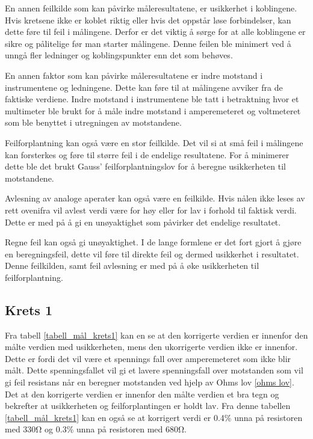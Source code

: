 \documentclass[twocolumn, a4paper, 11pt]{article} %
\begin{document}
En annen feilkilde som kan påvirke måleresultatene, er usikkerhet i koblingene. Hvis kretsene ikke er koblet riktig eller hvis det oppstår løse forbindelser, kan dette føre til feil i målingene. Derfor er det viktig å sørge for at alle koblingene er sikre og pålitelige før man starter målingene. Denne feilen ble minimert ved å unngå fler ledninger og koblingspunkter enn det som behøves.

En annen faktor som kan påvirke måleresultatene er indre motstand i instrumentene og ledningene. Dette kan føre til at målingene avviker fra de faktiske verdiene. Indre motstand i instrumentene ble tatt i betraktning hvor et multimeter ble brukt for å måle indre motstand i amperemeteret og voltmeteret som ble benyttet i utregningen av motstandene. 

Feilforplantning kan også være en stor feilkilde. Det vil si at små feil i målingene kan forsterkes og føre til større feil i de endelige resultatene. For å minimerer dette ble det brukt Gauss’ feilforplantningslov for å beregne usikkerheten til motstandene. 

Avlesning av analoge aperater kan også være en feilkilde. Hvis nålen ikke leses av rett ovenifra vil avlest verdi være for høy eller for lav i forhold til faktisk verdi. Dette er med på å gi en unøyaktighet som påvirker det endelige resultatet.

Regne feil kan også gi unøyaktighet. I de lange formlene er det fort gjort å gjøre en beregningsfeil, dette vil føre til direkte feil og dermed usikkerhet i resultatet. Denne feilkilden, samt feil avlesning er med på å øke usikkerheten til feilforplantning. 


\subsection{Krets 1}

Fra tabell \ref{tabell_mål_krets1} kan en se at den korrigerte verdien er innenfor den målte verdien med usikkerheten, mens den ukorrigerte verdien ikke er innenfor. Dette er fordi det vil være et spennings fall over amperemeteret som ikke blir målt. Dette spenningsfallet vil gi et lavere spenningsfall over motstanden som vil gi feil resistans når en beregner motstanden ved hjelp av Ohms lov \eqref{ohms lov}. Det at den korrigerte verdien er innenfor den målte verdien et bra tegn og bekrefter at usikkerheten og feilforplantingen er holdt lav. Fra denne tabellen \ref{tabell_mål_krets1} kan en også se at korrigert verdi er 0.4\% unna på resistoren med 330$\si{\ohm}$ og 0.3\% unna på resistoren med 680$\si{\ohm}$.
\end{document}
